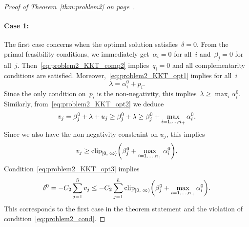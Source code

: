 \begin{proof}[Proof of Theorem~\ref{thm:problem2} on page~\pageref{thm:problem2}]
  \paragraph*{Case 1:} The first case concerns when the optimal solution satisfies~$\delta=0$. From the primal feasibility conditions, we immediately get~$\alpha_i = 0$ for all~$i$ and~$\beta_j = 0$ for all~$j$. Then~\eqref{eq:problem2_KKT_comp2} implies~$q_i=0$ and all complementarity conditions are satisfied. Moreover,~\eqref{eq:problem2_KKT_opt1} implies for all~$i$
  \begin{equation*}
    \lambda = \alpha_i^0 + p_i.
  \end{equation*}
  Since the only condition on~$p_i$ is the non-negativity, this implies~$\lambda \ge \max_i \alpha_i^0$. Similarly, from~\eqref{eq:problem2_KKT_opt2} we deduce
  \begin{equation*}
    v_j
      = \beta_j^0 +\lambda + u_j
      \ge \beta_j^0 + \lambda
      \ge \beta_j^0 + \max_{i=1,\dots,n_{+}} \alpha_i^0.
  \end{equation*}
  Since we also have the non-negativity constraint on $u_j$, this implies
  \begin{equation*}
    v_j \ge \clip[u]{0}{\infty}{\beta_j^0 + \max_{i=1,\dots,\npos} \alpha_i^0}.
  \end{equation*}
  Condition~\eqref{eq:problem2_KKT_opt3} implies
  \begin{equation*}
    \delta^0
      = -C_2 \sum_{j = 1}^{\ntil} v_j
      \le -C_2 \sum_{j = 1}^{\ntil} \clip[u]{0}{\infty}{\beta_j^0 + \max_{i=1,\dots,\npos} \alpha_i^0}.
  \end{equation*}
  This corresponds to the first case in the theorem statement and the violation of condition~\eqref{eq:problem2_cond}.


\end{proof}
